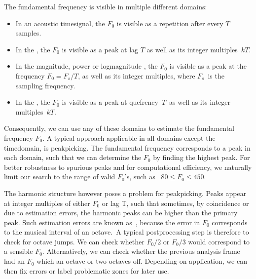 \documentclass[letterpaper,10pt,english]{jupyterBook}
\begin{document}
\sphinxAtStartPar
The fundamental frequency is visible in multiple different domains:
\begin{itemize}
\item {} 
\sphinxAtStartPar
In an acoustic time\sphinxhyphen{}signal, the \(F_0\) is visible as a repetition after
every \(T\) samples.

\item {} 
\sphinxAtStartPar
In the , the \(F_0\) is visible
as a peak at lag \(T\) as well as its integer multiples \(kT\).

\item {} 
\sphinxAtStartPar
In the magnitude, power or log\sphinxhyphen{}magnitude
, the \(F_0\) is visible as a peak at
the frequency \(F_0=F_{s}/T\), as well as its integer
multiples, where \(F_{s}\) is the sampling frequency.

\item {} 
\sphinxAtStartPar
In the , the \(F_0\) is visible as a peak at
quefrency \(T\) as well as its integer multiples \(kT\).

\end{itemize}

\sphinxAtStartPar
Consequently, we can use any of these domains to estimate the
fundamental frequency \(F_0\). A typical approach applicable in all domains
except the time\sphinxhyphen{}domain, is peak\sphinxhyphen{}picking. The fundamental frequency
corresponds to a peak in each domain, such that we can determine the \(F_0\)
by finding the highest peak. For better robustness to spurious peaks and
for computational efficiency, we naturally limit our search to the range
of valid \(F_0\)’s, such as  \( 80\leq F_0\leq 450. \)

\sphinxAtStartPar
The harmonic structure however poses a problem for peak\sphinxhyphen{}picking. Peaks
appear at integer multiples of either \(F_0\) or lag T, such that sometimes,
by coincidence or due to estimation errors, the harmonic peaks can be
higher than the primary peak. Such estimation errors are known
as , because the error in \(F_0\) corresponds to the musical
interval of an octave. A typical post\sphinxhyphen{}processing step is therefore to
check for octave jumps. We can check whether \(F_0/2\) or \(F_0/3\) would
correspond to a sensible \(F_0\). Alternatively, we can check whether the
previous analysis frame had an \(F_0\) which an octave or two octaves off.
Depending on application, we can then fix errors or label problematic
zones for later use.
\end{document}
